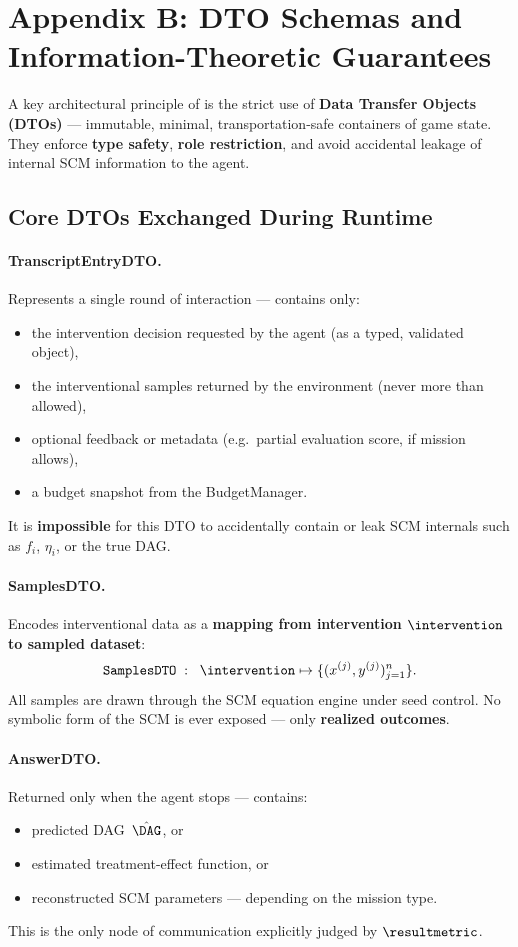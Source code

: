 \section{Appendix B: DTO Schemas and Information-Theoretic Guarantees}
\label{appendix:dtos}

A key architectural principle of \game is the strict use of \textbf{Data Transfer Objects (DTOs)} — immutable, minimal, transportation-safe containers of game state.
They enforce \textbf{type safety}, \textbf{role restriction}, and avoid accidental leakage of internal SCM information to the agent.

\subsection{Core DTOs Exchanged During Runtime}

\paragraph{TranscriptEntryDTO.}
Represents a single round of interaction — contains only:
\begin{itemize}
    \item the intervention decision requested by the agent (as a typed, validated object),
    \item the interventional samples returned by the environment (never more than allowed),
    \item optional feedback or metadata (e.g.\ partial evaluation score, if mission allows),
    \item a budget snapshot from the BudgetManager.
\end{itemize}
It is \textbf{impossible} for this DTO to accidentally contain or leak SCM internals such as $f_i$, $\eta_i$, or the true DAG.

\paragraph{SamplesDTO.}
Encodes interventional data as a \textbf{mapping from intervention $\intervention$ to sampled dataset}:
\[
    \texttt{SamplesDTO} \;:\;\;
    \intervention \mapsto \{(x^{(j)}, y^{(j)})_{j=1}^n\}.
\]
All samples are drawn through the SCM equation engine under seed control.  
No symbolic form of the SCM is ever exposed — only \textbf{realized outcomes}.

\paragraph{AnswerDTO.}
Returned only when the agent stops — contains:
\begin{itemize}
    \item predicted DAG $\,\hat{\DAG}$, or
    \item estimated treatment-effect function, or
    \item reconstructed SCM parameters — depending on the mission type.
\end{itemize}
This is the only node of communication explicitly judged by $\resultmetric$.


